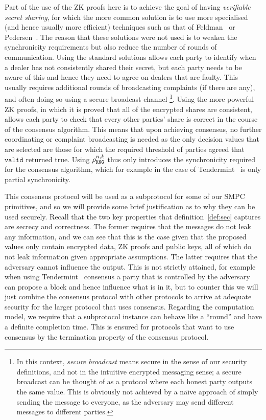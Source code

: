\documentclass{article}
\theoremstyle{remark}
\begin{document}
Part of the use of the ZK proofs here is to achieve the goal of having
\textit{verifiable secret sharing}, for which the more common solution is to
use more specialised (and hence usually more efficient) techniques such as that
of Feldman~\cite{feldman_1987} or Pedersen~\cite{p91a}. The reason
that these solutions were not used is to weaken the synchronicity requirements
but also reduce the number of rounds of communication. Using the standard
solutions allows each party to identify when a dealer has not consistently
shared their secret, but each party needs to be aware of this and hence they
need to agree on dealers that are faulty. This usually requires additional
rounds of broadcasting complaints (if there are any), and often doing so using
a secure broadcast channel%
\footnote{%
	In this context, \textit{secure broadcast} means secure in the sense of our
	security definitions, and not in the intuitive encrypted messaging sense; a
	secure broadcast can be thought of as a protocol where each honest party
	outputs the same value. This is obviously not achieved by a na\"{\i}ve
	approach of simply sending the message to everyone, as the adversary may
	send different messages to different parties.
}.
Using the more powerful ZK proofs, in which it is proved that all of the
encrypted shares are consistent, allows each party to check that every other
parties' share is correct in the course of the consensus algorithm. This means
that upon achieving consensus, no further coordinating or complaint
broadcasting is needed as the only decision values that are selected are those
for which the required threshold of parties agreed that $\texttt{valid}$
returned true. Using $\rho_\texttt{RNG}^{n, k}$ thus only introduces the synchronicity
required for the consensus algorithm, which for example in the case of
Tendermint~\cite{buchman_2018} is only partial synchronicity.

This consensus protocol will be used as a subprotocol for some of our SMPC
primitives, and so we will provide some brief justification as to why they can
be used securely. Recall that the two key properties that
definition~\ref{def:sec} captures are secrecy and correctness. The former
requires that the messages do not leak any information, and we can see that
this is the case given that the proposed values only contain encrypted data, ZK
proofs and public keys, all of which do not leak information given appropriate
assumptions. The latter requires that the adversary cannot influence the
output. This is not strictly attained, for example when using
Tendermint~\cite{buchman_2018} consensus a party that is controlled by the
adversary can propose a block and hence influence what is in it, but to counter
this we will just combine the consensus protocol with other protocols to arrive
at adequate security for the larger protocol that uses consensus. Regarding the
computation model, we require that a subprotocol instance can behave like a
``round'' and have a definite completion time. This is ensured for protocols
that want to use consensus by the termination property of the consensus
protocol.
\end{document}
